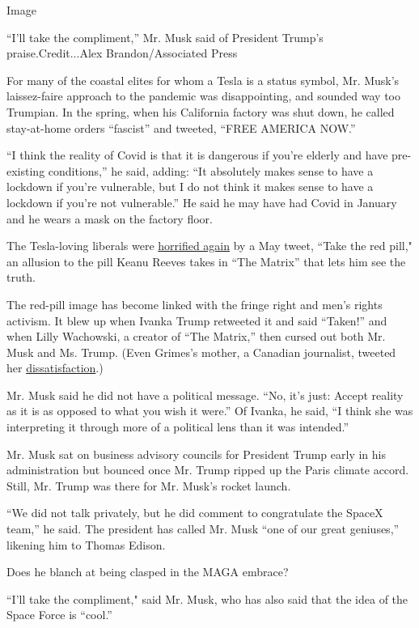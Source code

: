 Image

``I'll take the compliment,'' Mr. Musk said of President Trump's
praise.Credit...Alex Brandon/Associated Press

For many of the coastal elites for whom a Tesla is a status symbol, Mr.
Musk's laissez-faire approach to the pandemic was disappointing, and
sounded way too Trumpian. In the spring, when his California factory was
shut down, he called stay-at-home orders ``fascist'' and tweeted, ``FREE
AMERICA NOW.''

``I think the reality of Covid is that it is dangerous if you're elderly
and have pre-existing conditions,'' he said, adding: ``It absolutely
makes sense to have a lockdown if you're vulnerable, but I do not think
it makes sense to have a lockdown if you're not vulnerable.'' He said he
may have had Covid in January and he wears a mask on the factory floor.

The Tesla-loving liberals were
\href{https://www.nytimes3xbfgragh.onion/2020/05/19/technology/elon-musk-tesla-red-pill.html}{horrified
again} by a May tweet, ``Take the red pill," an allusion to the pill
Keanu Reeves takes in ``The Matrix'' that lets him see the truth.

The red-pill image has become linked with the fringe right and men's
rights activism. It blew up when Ivanka Trump retweeted it and said
``Taken!'' and when Lilly Wachowski, a creator of ``The Matrix,'' then
cursed out both Mr. Musk and Ms. Trump. (Even Grimes's mother, a
Canadian journalist, tweeted her
\href{https://www.buzzfeed.com/stephenlaconte/elon-musk-was-just-called-out-by-grimes-mom-for-his}{dissatisfaction}.)

Mr. Musk said he did not have a political message. ``No, it's just:
Accept reality as it is as opposed to what you wish it were.'' Of
Ivanka, he said, ``I think she was interpreting it through more of a
political lens than it was intended.''

Mr. Musk sat on business advisory councils for President Trump early in
his administration but bounced once Mr. Trump ripped up the Paris
climate accord. Still, Mr. Trump was there for Mr. Musk's rocket launch.

``We did not talk privately, but he did comment to congratulate the
SpaceX team,'' he said. The president has called Mr. Musk ``one of our
great geniuses,'' likening him to Thomas Edison.

Does he blanch at being clasped in the MAGA embrace?

``I'll take the compliment," said Mr. Musk, who has also said that the
idea of the Space Force is ``cool.''

